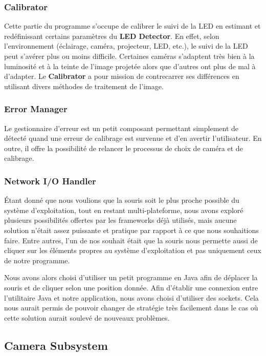 \documentclass[11pt,a4paper,oldfontcommands]{memoir}
\begin{document}
\subsubsection{Calibrator}

Cette partie du programme s'occupe de calibrer le suivi de la LED en estimant et redéfinissant certains paramètres du \textbf{LED Detector}. En effet, selon l'environnement (éclairage, caméra, projecteur, LED, etc.), le suivi de la LED peut s'avérer plus ou moins difficile. Certaines caméras s'adaptent très bien à la luminosité et à la teinte de l'image projetée alors que d'autres ont plus de mal à d'adapter. Le \textbf{Calibrator} a pour mission de contrecarrer ses différences en utilisant divers méthodes de traitement de l'image.

\subsubsection{Error Manager}

Le gestionnaire d'erreur est un petit composant permettant simplement de détecté quand une erreur de calibrage est survenue et d'en avertir l'utilisateur. En outre, il offre la possibilité de relancer le processus de choix de caméra et de calibrage.

\subsubsection{Network I/O Handler}

Étant donné que nous voulions que la souris soit le plus proche possible du système d'exploitation, tout en restant multi-plateforme, nous avons exploré plusieurs possibilités offertes par les frameworks déjà utilisés, mais aucune solution n'était assez puissante et pratique par rapport à ce que nous souhaitions faire. Entre autres, l'un de nos souhait était que la souris nous permette aussi de cliquer sur les éléments propres au système d'exploitation et pas uniquement ceux de notre programme.

Nous avons alors choisi d'utiliser un petit programme en Java afin de déplacer la souris et de cliquer selon une position donnée. Afin d'établir une connexion entre l'utilitaire Java et notre application, nous avons choisi d'utiliser des sockets. Cela nous aurait permis de pouvoir changer de stratégie très facilement dans le cas où cette solution aurait soulevé de nouveaux problèmes.

\newpage

\subsection{Camera Subsystem}
\end{document}
